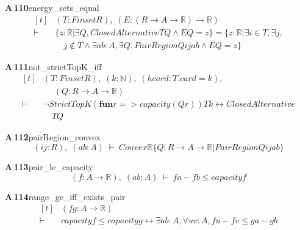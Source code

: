 \documentclass[conference]{IEEEtran}
\theoremstyle{definition}
\newcommand{\lean}[1]{\textsf{\footnotesize #1}}
\begin{document}
\noindent\textbf{A\,110}\quad\lean{energy\_sets\_equal}
{\footnotesize\[ \begin{aligned}[t]
&(\mathit{T} : \mathit{Finset} \mathit{R}),\; (\mathit{E} : (\mathit{R} \to \mathit{A} \to \mathbb{R} ) \to \mathbb{R} )\\
\vdash\;&\{ \mathit{z} : \mathbb{R} | \exists \mathit{Q}, \mathit{ClosedAlternative} \mathit{T} \mathit{Q} \wedge \mathit{E} \mathit{Q} = \mathit{z}\} = \{ \mathit{z} : \mathbb{R} | \exists \mathit{i} \in \mathit{T}, \exists \mathit{j},\\
&\quad \mathit{j} \notin \mathit{T} \wedge \exists \mathit{a} \mathit{b} : \mathit{A}, \exists \mathit{Q}, \mathit{PairRegion} \mathit{Q} \mathit{i} \mathit{j} \mathit{a} \mathit{b} \wedge \mathit{E} \mathit{Q} = \mathit{z}\}
\end{aligned} \]}

\noindent\textbf{A\,111}\quad\lean{not\_strictTopK\_iff}
{\footnotesize\[ \begin{aligned}[t]
&(\mathit{T} : \mathit{Finset} \mathit{R}),\; (\mathit{k} : \mathbb{N} ),\; (\mathit{hcard} : \mathit{T}.\mathit{card} = \mathit{k}),\\
&\quad \; (\mathit{Q} : \mathit{R} \to \mathit{A} \to \mathbb{R} )\\
\vdash\;&\neg \mathit{StrictTopK} (\mathbf{fun} \mathit{r} => \mathit{capacity} (\mathit{Q} \mathit{r})) \mathit{T} \mathit{k} \leftrightarrow \mathit{ClosedAlternative}\\
&\quad \mathit{T} \mathit{Q}
\end{aligned} \]}

\noindent\textbf{A\,112}\quad\lean{pairRegion\_convex}
{\footnotesize\[ (\mathit{i} \mathit{j} : \mathit{R}),\; (\mathit{a} \mathit{b} : \mathit{A}) \;\vdash\; \mathit{Convex} \mathbb{R} \{ \mathit{Q} : \mathit{R} \to \mathit{A} \to \mathbb{R} | \mathit{PairRegion} \mathit{Q} \mathit{i} \mathit{j} \mathit{a} \mathit{b}\} \]}

\noindent\textbf{A\,113}\quad\lean{pair\_le\_capacity}
{\footnotesize\[ (\mathit{f} : \mathit{A} \to \mathbb{R} ),\; (\mathit{a} \mathit{b} : \mathit{A}) \;\vdash\; \mathit{f} \mathit{a} - \mathit{f} \mathit{b} \leq \mathit{capacity} \mathit{f} \]}

\noindent\textbf{A\,114}\quad\lean{range\_ge\_iff\_exists\_pair}
{\footnotesize\[ \begin{aligned}[t]
&(\mathit{f} \mathit{g} : \mathit{A} \to \mathbb{R} )\\
\vdash\;&\mathit{capacity} \mathit{f} \leq \mathit{capacity} \mathit{g} \leftrightarrow \exists \mathit{a} \mathit{b} : \mathit{A}, \forall \mathit{u} \mathit{v} : \mathit{A}, \mathit{f} \mathit{u} - \mathit{f} \mathit{v} \leq \mathit{g} \mathit{a} - \mathit{g} \mathit{b}
\end{aligned} \]}
\end{document}

